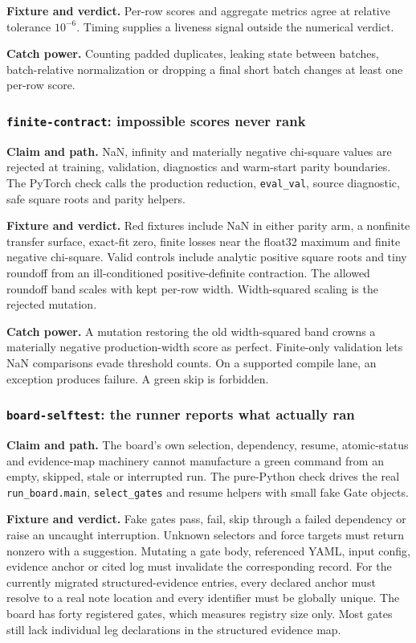 \documentclass[10pt,aps,prd,twocolumn,nofootinbib]{revtex4-2}
\newcommand{\code}[1]{\texttt{#1}}
\begin{document}
\textbf{Fixture and verdict.}  Per-row scores and aggregate metrics agree at
relative tolerance \(10^{-6}\).  Timing supplies a liveness signal outside the
numerical verdict.

\textbf{Catch power.}  Counting padded duplicates, leaking state between
batches, batch-relative normalization or dropping a final short batch
changes at least one per-row score.

\subsubsection{\code{finite-contract}: impossible scores never rank}

\textbf{Claim and path.}  NaN, infinity and materially negative chi-square
values are rejected at training, validation, diagnostics and warm-start
parity boundaries.  The PyTorch check calls the production reduction,
\code{eval\_val}, source diagnostic, safe square roots and parity helpers.

\textbf{Fixture and verdict.}  Red fixtures include NaN in either parity arm,
a nonfinite transfer surface, exact-fit zero, finite losses near the float32
maximum and finite negative chi-square.  Valid controls include analytic
positive square roots and tiny roundoff from an ill-conditioned
positive-definite contraction.  The allowed roundoff band scales with kept
per-row width.  Width-squared scaling is the rejected mutation.

\textbf{Catch power.}  A mutation restoring the old width-squared band crowns
a materially negative production-width score as perfect.  Finite-only
validation lets NaN comparisons evade threshold counts.  On a supported
compile lane, an exception produces failure.  A green skip is forbidden.

\subsubsection{\code{board-selftest}: the runner reports what actually ran}

\textbf{Claim and path.}  The board's own selection, dependency, resume,
atomic-status and evidence-map machinery cannot manufacture a green command
from an empty, skipped, stale or interrupted run.  The pure-Python check
drives the real \code{run\_board.main}, \code{select\_gates} and resume
helpers with small fake Gate objects.

\textbf{Fixture and verdict.}  Fake gates pass, fail, skip through a failed
dependency or raise an uncaught interruption.  Unknown selectors and force
targets must return nonzero with a suggestion.  Mutating a gate body,
referenced YAML, input config, evidence anchor or cited log must invalidate
the corresponding record.  For the currently migrated structured-evidence
entries, every declared anchor must resolve to a real note location and every
identifier must be globally unique.  The board has forty registered gates,
which measures registry size only.  Most gates still lack individual leg
declarations in the structured evidence map.
\end{document}
